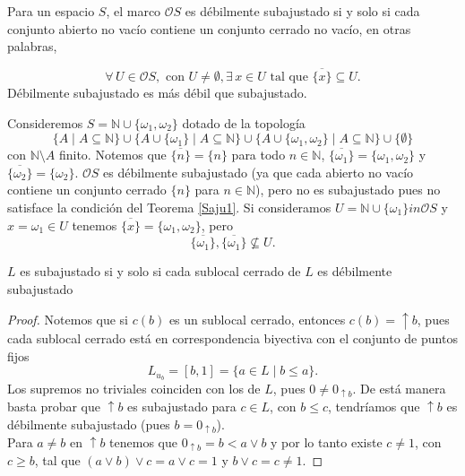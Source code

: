 \documentclass{comunicaciones}
\begin{document}
Para un espacio $S$, el marco $\mathcal{O}S$ es débilmente subajustado si y solo si cada conjunto abierto no vacío contiene un conjunto cerrado no vacío, en otras palabras,

\[
\forall\, U\in \mathcal{O}S, \mbox{ con } U\neq \emptyset, \exists\, x\in U \mbox{ tal que } \overline{\{x\}}\subseteq U.
\]
Débilmente subajustado es más débil que subajustado.

\begin{ej}
    Consideremos $S=\mathbb{N}\cup \{\omega_1, \omega_2\}$ dotado de la topología 
    \[
    \{A\mid A\subseteq \mathbb{N}\}\cup \{A\cup \{\omega_1\}\mid A\subseteq \mathbb{N}\}\cup \{A\cup \{\omega_1,\omega_2\}\mid A\subseteq \mathbb{N}\}\cup \{\emptyset\}
    \]
    con $\mathbb{N}\setminus A$ finito. Notemos que $\overline{\{n\}}=\{n\}$ para todo $n\in \mathbb{N}$, $\overline{\{\omega_1\}}=\{\omega_1, \omega_2\}$ y $\overline{\{\omega_2\}}=\{\omega_2\}$. $\mathcal{O}S$ es débilmente subajustado (ya que cada abierto no vacío contiene un conjunto cerrado $\{n\}$ para $n\in \mathbb{N}$), pero no es subajustado pues no satisface la condición del Teorema \ref{Saju1}. Si consideramos $U=\mathbb{N}\cup \{\omega_1\}in \mathcal{O}S$ y $x=\omega_1\in U$ tenemos $\overline{\{x\}}=\{\omega_1,\omega_2\}$, pero 
    \[
    \overline{\{\omega_1\}}, \overline{\{\omega_1\}}\nsubseteq U.
    \]
\end{ej}

\begin{prop}\label{Dsaju}
    $L$ es subajustado si y solo si cada sublocal cerrado de $L$ es débilmente subajustado 
\end{prop}

\begin{proof}
    Notemos que si $c(b)$ es un sublocal cerrado, entonces $c(b)=\uparrow b$, pues cada sublocal cerrado está en correspondencia biyectiva con el conjunto de puntos fijos 
    \[
    L_{u_b}=[b, 1]=\{a\in L\mid b\leq a\}.
    \]
    Los supremos no triviales coinciden con los de $L$, pues $0\neq 0_{\uparrow b}$. De está manera basta probar que $\uparrow b$ es subajustado para $c\in L$, con $b\leq c$, tendríamos que $\uparrow b$ es débilmente subajustado (pues $b=0_{\uparrow b}$).\\
    
    \noindent
    Para $a\neq b$ en $\uparrow b$ tenemos que $0_{\uparrow b} =b< a\vee b$ y por lo tanto existe $c\neq 1$, con $c\geq b$, tal que $(a\vee b)\vee c=a\vee c=1$ y $b\vee c=c\neq 1$.
\end{proof}
\end{document}
